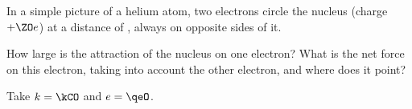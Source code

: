 In a simple picture of a helium atom, two electrons circle the nucleus (charge $+\ZO e$) at a distance of \reO, always on opposite sides of it.

\begin{abcliste}
\abc How large is the attraction of the nucleus on one electron?
\abc What is the net force on this electron, taking into account the other electron, and where does it point?
\end{abcliste}

Take $k = \kCO$ and $e = \qeO$.
